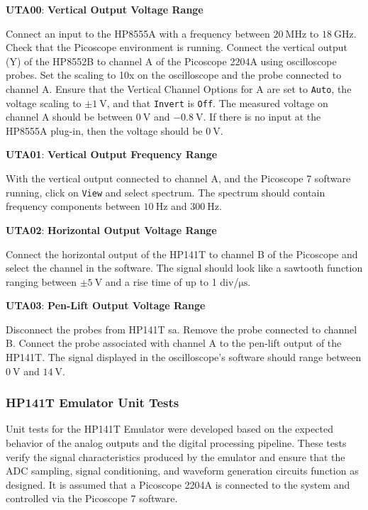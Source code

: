 \documentclass[class=report,11pt,crop=false]{standalone}
\begin{document}
	\begin{center}
		\textbf{UTA00}: \textbf{Vertical Output Voltage Range} 
	\end{center}
	Connect an input to the HP8555A with a frequency between $\SI{20}{\mega\hertz}$ to $\SI{18}{\giga\hertz}$. Check that the Picoscope environment is running. Connect the vertical output (Y) of the HP8552B to channel A of the Picoscope 2204A using oscilloscope probes. Set the scaling to 10x on the oscilloscope and the probe connected to channel A. Ensure that the Vertical Channel Options for A are set to \texttt{Auto}, the voltage scaling to $\pm\SI{1}{\volt}$, and that \texttt{Invert} is \texttt{Off}. The measured voltage on channel A should be between $\SI{0}{\volt}$ and $-\SI{0.8}{\volt}$. If there is no input at the HP8555A plug-in, then the voltage should be $\SI{0}{\volt}$. 
	
	\begin{center}
		\textbf{UTA01}: \textbf{Vertical Output Frequency Range}  
	\end{center}
	With the vertical output connected to channel A, and the Picoscope 7 software running, click on \texttt{View} and select spectrum. The spectrum should contain frequency components between $\SI{10}{\hertz}$ and $\SI{300}{\hertz}$.
	
	\begin{center}
		\textbf{UTA02}: \textbf{Horizontal Output Voltage Range} 
	\end{center}
	Connect the horizontal output of the HP141T to channel B of the Picoscope and select the channel in the software. The signal should look like a sawtooth function ranging between $\pm\SI{5}{\volt}$ and a rise time of up to 1 div/$\si{\micro\second}$. 
	
	\begin{center}
		\textbf{UTA03}: \textbf{Pen-Lift Output Voltage Range}
	\end{center}
	Disconnect the probes from HP141T \acrshort{sa}. Remove the probe connected to channel B. Connect the probe associated with channel A to the pen-lift output of the HP141T. The signal displayed in the oscilloscope's software should range between $\SI{0}{\volt}$ and $\SI{14}{\volt}$. 
	
	\subsubsection{HP141T Emulator Unit Tests}
	Unit tests for the HP141T Emulator were developed based on the expected behavior of the analog outputs and the digital processing pipeline. These tests verify the signal characteristics produced by the emulator and ensure that the ADC sampling, signal conditioning, and waveform generation circuits function as designed. It is assumed that a Picoscope 2204A is connected to the system and controlled via the Picoscope 7 software.
	
\end{document}
